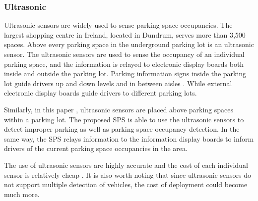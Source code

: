 \subsubsection*{Ultrasonic}
Ultrasonic sensors are widely used to sense parking space occupancies. The largest shopping centre in Ireland, located in Dundrum, serves more than 3,500 spaces. Above every parking space in the underground parking lot is an ultrasonic sensor. The ultrasonic sensors are used to sense the occupancy of an individual parking space, and the information is relayed to electronic display boards both inside and outside the parking lot. Parking information signs inside the parking lot guide drivers up and down levels and in between aisles \citep{2008BAY-SPECIFICCENTRE}. While external electronic display boards guide drivers to different parking lots.

Similarly, in this paper \citep{Kianpisheh2012SmartDetector}, ultrasonic sensors are placed above parking spaces within a parking lot. The proposed \ac{SPS} is able to use the ultrasonic sensors to detect improper parking as well as parking space occupancy detection. In the same way, the \ac{SPS} relays information to the information display boards to inform drivers of the current parking space occupancies in the area.

The use of ultrasonic sensors are highly accurate and the cost of each individual sensor is relatively cheap \citep{dokur_embedded_2016}. It is also worth noting that since ultrasonic sensors do not support multiple detection of vehicles, the cost of deployment could become much more.